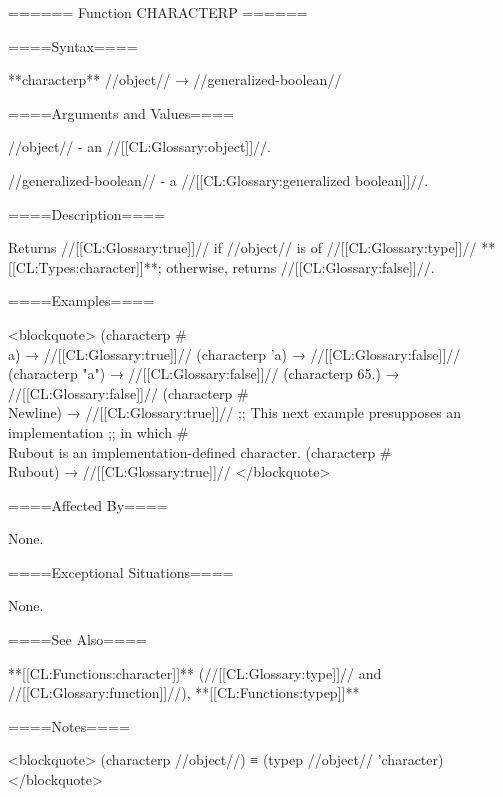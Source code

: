 ====== Function CHARACTERP ======

====Syntax====

**characterp** //object// → //generalized-boolean//

====Arguments and Values====

//object// - an //[[CL:Glossary:object]]//.

//generalized-boolean// - a //[[CL:Glossary:generalized boolean]]//.

====Description====

Returns //[[CL:Glossary:true]]// if //object// is of //[[CL:Glossary:type]]// **[[CL:Types:character]]**; otherwise, returns //[[CL:Glossary:false]]//.

====Examples====

<blockquote> (characterp #\\a) → //[[CL:Glossary:true]]// (characterp 'a) → //[[CL:Glossary:false]]// (characterp "a") → //[[CL:Glossary:false]]// (characterp 65.) → //[[CL:Glossary:false]]// (characterp #\\Newline) → //[[CL:Glossary:true]]// ;; This next example presupposes an implementation ;; in which #\\Rubout is an implementation-defined character. (characterp #\\Rubout) → //[[CL:Glossary:true]]// </blockquote>

====Affected By====

None.

====Exceptional Situations====

None.

====See Also====

**[[CL:Functions:character]]** (//[[CL:Glossary:type]]// and //[[CL:Glossary:function]]//), **[[CL:Functions:typep]]**

====Notes====

<blockquote> (characterp //object//) ≡ (typep //object// 'character) </blockquote>

